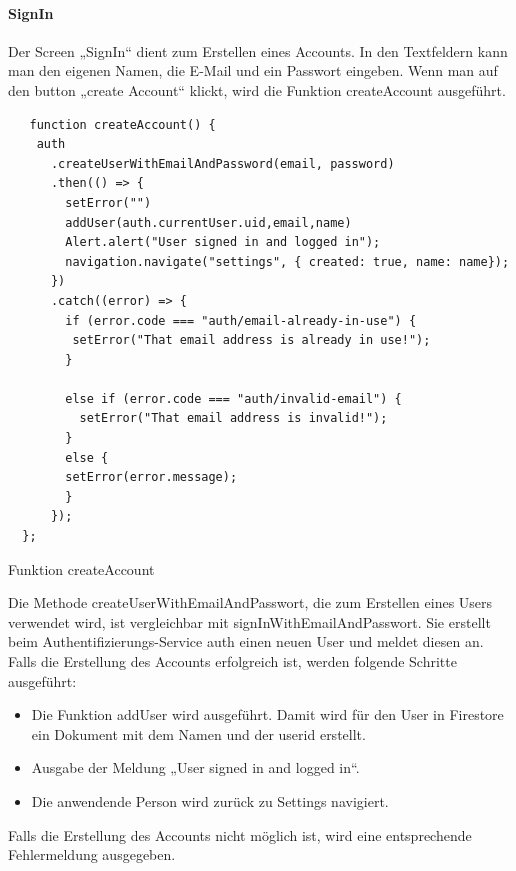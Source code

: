 \bigskip


\paragraph{SignIn}Der Screen „SignIn“ dient zum Erstellen eines Accounts. In den Textfeldern kann man den eigenen Namen, die E-Mail und ein Passwort eingeben.
\noindent Wenn man auf den button „create Account“ klickt, wird die Funktion createAccount ausgeführt.

\begin{listing}[H]
  \begin{verbatim}
   function createAccount() {
    auth
      .createUserWithEmailAndPassword(email, password)
      .then(() => {
        setError("")
        addUser(auth.currentUser.uid,email,name)
        Alert.alert("User signed in and logged in");
        navigation.navigate("settings", { created: true, name: name});
      })
      .catch((error) => {
        if (error.code === "auth/email-already-in-use") {
         setError("That email address is already in use!");
        }

        else if (error.code === "auth/invalid-email") {
          setError("That email address is invalid!");
        }
        else {
        setError(error.message);
        }
      });
  };
\end{verbatim}
  \caption{Funktion createAccount}
  \label{lst:createaccount}
\end{listing}

Die Methode createUserWithEmailAndPasswort, die zum Erstellen eines Users verwendet wird, ist vergleichbar mit signInWithEmailAndPasswort. Sie erstellt beim Authentifizierungs-Service auth einen neuen User und meldet diesen an. Falls die Erstellung des Accounts erfolgreich ist, werden folgende Schritte ausgeführt:

\begin{itemize}
  \item Die Funktion addUser wird ausgeführt. Damit wird für den User in Firestore ein Dokument mit dem Namen und der userid erstellt.
  \item Ausgabe der Meldung „User signed in and logged in“.
  \item Die anwendende Person wird zurück zu Settings navigiert.
\end{itemize}

Falls die Erstellung des Accounts nicht möglich ist, wird eine entsprechende Fehlermeldung ausgegeben.

